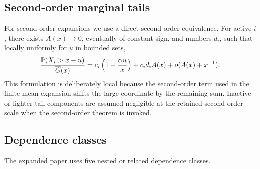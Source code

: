 \subsection{Second-order marginal tails}

For second-order expansions we use a direct second-order equivalence. For
active \(i\), there exists \(A(x)\to0\), eventually of constant sign, and
numbers \(d_i\), such that locally uniformly for \(u\) in bounded sets,
\[
  \frac{\mathbb{P}(X_i>x-u)}{\overline{G}(x)}
  = c_i\left(1+\frac{\alpha u}{x}\right)
    + c_id_iA(x) + o(A(x)+x^{-1}).
\]
This formulation is deliberately local because the second-order term used in
the finite-mean expansion shifts the large coordinate by the remaining sum.
Inactive or lighter-tail components are assumed negligible at the retained
second-order scale when the second-order theorem is invoked.

\subsection{Dependence classes}

The expanded paper uses five nested or related dependence classes.

